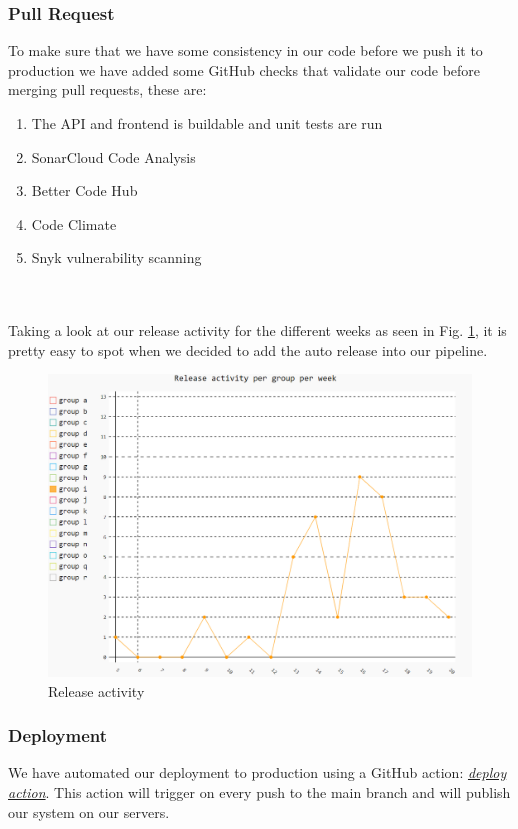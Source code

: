 \documentclass[10pt]{article}
\begin{document}
\subsubsection{Pull Request}
To make sure that we have some consistency in our code before we push it to production we have added some GitHub checks that validate our code before merging pull requests, these are:
\begin{enumerate}
    \item The API and frontend is buildable and unit tests are run
    \item SonarCloud Code Analysis
    \item Better Code Hub
    \item Code Climate
    \item Snyk vulnerability scanning
\end{enumerate}
\\
\\
Taking a look at our release activity for the different weeks as seen in Fig. \ref{fig:release_activity}, it is  pretty easy to spot when we decided to add the auto release into our pipeline.
\begin{figure}[H]
    \centering
    \includegraphics[width=\textwidth]{images/ReleaseActivity.PNG}
    \caption{Release activity}
    \label{fig:release_activity}
\end{figure}
\subsubsection{Deployment}
We have automated our deployment to production using a GitHub action: 
\href{https://github.com/Arklaide/devopsITUproject/blob/main/.github/workflows/deploy.yaml}{\textit{deploy action}}.
This action will trigger on every push to the main branch and will publish our system on our servers. 
\end{document}
